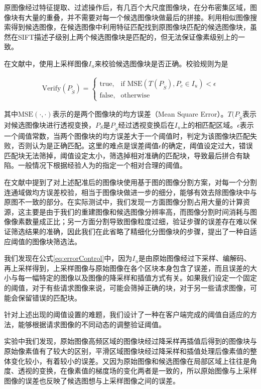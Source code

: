 原图像经过特征提取、过滤操作后，有几百个大尺度图像块，在分布密集区域，图像块有大量的重叠，并不需要对每一个候选图像块做最后的拼接。利用相似图像搜索得到候选图像，在候选图像中利用特征匹配找到原图像块匹配的候选图像块，虽然在SIFT描述子级别上两个候选图像块是匹配的，但无法保证像素级别上的一致。

在文献\cite{Dai:2012vn}中，使用上采样图像\(I_u\)来校验候选图像块是否正确。校验规则为是

\begin{align}
\label{eq:errorControl}
  \text{Verify}(P_{\tilde{S}}) = 
\begin{cases} 
\text{true}, & \mbox{if MSE} (T(P_{\tilde{S}}),P_c \in I_u) < \epsilon \\
\text{false}, & \mbox{otherwise}
\end{cases}
\end{align}

其中\(\text{MSE}(\cdot,\cdot)\)表示的是两个图像块的均方误差（Mean Square Error）。\(T(P_{\tilde{S}}\)表示对候选图像块进行透视变换，\(P_{S}\)是\(P_{\tilde{S}}\)经过透视变换后在\(I_u\)上的相匹配区域。\(\epsilon\)表示一个阈值常数，当两个图像块的均方误差大于一个阈值时，判定为该图像块匹配失败，否则认为是正确匹配。这里的难点是误差阈值\(\epsilon\)的确定，阈值设定过大，错误匹配块无法筛掉，阈值设定太小，筛选掉相对准确的匹配块，导致最后拼合有缺陷。一般情况下根据经验人为的指定一个相对合理的阈值。

在文献\cite{Dai:2012vn}中提到了对上述配准后的图像块使用基于图的图像分割方案，对每一个分割连通域做均方误差校验，相当于图像块做进一步的细分，能够有效去除图像块中与原图不一致的部分。在实际测试中，我们发现一方面图像分割占用大量的计算资源，这主要是由于我们的重建图像和候选图像分辨率高，而图像分割时间消耗与图像像素数量成正比；另一方面分割导致图像粒度过细，验证步骤的误差存在难以保证筛选结果的准确，因此我们在此省略了精细化分图像块的步骤，提出了一种自适应阈值的图像块筛选法。

我们发现在公式\ref{eq:errorControl}中，因为\(I_u\)是由原始图像经过下采样、编解码、再上采样得到，上采样图像与原始图像在各个区块本身包含了误差，而且误差的大小与每一幅特定的图像以及图像的降采样和插值方式有关。如果我们设定一个固定的阈值，对于有些请求图像来说，可能会筛掉正确的块，对于另一些请求图像，可能会保留错误的匹配块。

针对上述出现的阈值设置的难题，我们设计了一种在客户端完成的阈值自适应的方法，能够根据请求图像的不同动态的调整验证阈值。

实验中我们发现，原始图像高频区域的图像块经过降采样再插值后得到的图像块与原始像素值有了较大的区别，平滑区域图像块经过降采样和插值处理后像素值的整体变化较小，有着较小的误差。又因为原始图像和候选图像在局部区域上往往是角度、透视的变换，在像素值的梯度场的变化两者是一致的，所以原始图像与上采样图像的误差也反映了候选图想与上采样图像之间的误差。

